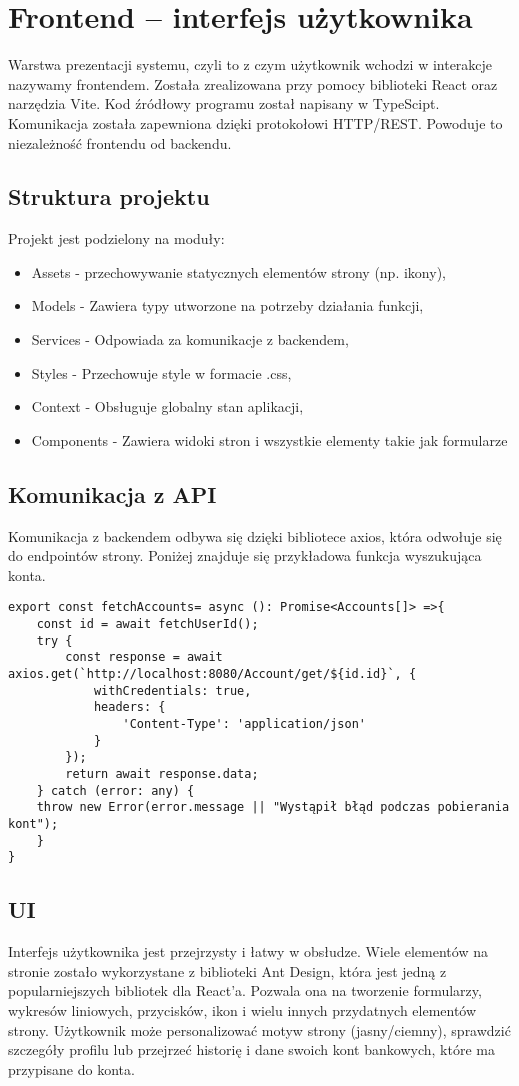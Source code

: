 \section{Frontend – interfejs użytkownika}
Warstwa prezentacji systemu, czyli to z czym użytkownik wchodzi w interakcje nazywamy frontendem. Została zrealizowana przy pomocy biblioteki React oraz narzędzia Vite. Kod źródłowy programu został napisany w TypeScipt. Komunikacja została zapewniona dzięki protokołowi HTTP/REST. Powoduje to niezależność frontendu od backendu.
\subsection*{Struktura projektu}
Projekt jest podzielony na moduły:
\begin{itemize}
	\item Assets - przechowywanie statycznych elementów strony (np. ikony),
	\item Models - Zawiera typy utworzone na potrzeby działania funkcji,
	\item Services - Odpowiada za komunikacje z backendem,
	\item Styles - Przechowuje style w formacie .css,
	\item Context - Obsługuje globalny stan aplikacji,
	\item Components - Zawiera widoki stron i wszystkie elementy takie jak formularze
\end{itemize}
\subsection*{Komunikacja z API}
Komunikacja z backendem odbywa się dzięki bibliotece axios, która odwołuje się do endpointów strony. Poniżej znajduje się przykładowa funkcja wyszukująca konta.
\begin{lstlisting}[caption={Funkcja wyszukująca wszystkie konta użytkownika}, label={lst:TS-service1}]
export const fetchAccounts= async (): Promise<Accounts[]> =>{
	const id = await fetchUserId();
	try {
		const response = await axios.get(`http://localhost:8080/Account/get/${id.id}`, {
			withCredentials: true,
			headers: {
				'Content-Type': 'application/json'
			}
		});
		return await response.data;
	} catch (error: any) {
	throw new Error(error.message || "Wystąpił błąd podczas pobierania kont");
	}
}
\end{lstlisting}

\subsection*{UI}
Interfejs użytkownika jest przejrzysty i łatwy w obsłudze. Wiele elementów na stronie zostało wykorzystane z biblioteki Ant Design, która jest jedną z popularniejszych bibliotek dla React'a. Pozwala ona na tworzenie formularzy, wykresów liniowych, przycisków, ikon i wielu innych przydatnych elementów strony. Użytkownik może personalizować motyw strony (jasny/ciemny), sprawdzić szczegóły profilu lub przejrzeć historię i dane swoich kont bankowych, które ma przypisane do konta.
